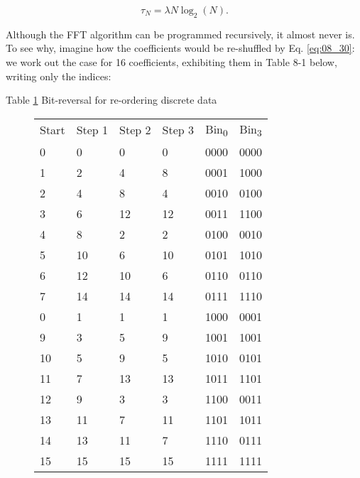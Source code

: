 \begin{equation}
\tau_{N} = \lambda N \log_{2}(N).
\end{equation}

Although the FFT algorithm can be programmed recursively, it almost never is. To see why, imagine how the coefficients would be re-shuffled by Eq. \ref{eq:08_30}: we work out the case for 16 coefficients, exhibiting them in Table 8-1 below, writing only the indices:

Table \ref{table:08_01} Bit-reversal for re-ordering discrete data

\begin{figure}
    \setlength{\tabcolsep}{1em}
    \begin{tabular}{llllll}
        \multicolumn{1}{c}{Start}  &
        \multicolumn{1}{c}{Step 1} &
        \multicolumn{1}{c}{Step 2} &
        \multicolumn{1}{c}{Step 3} & 
        \multicolumn{1}{c}{Bin\textsubscript{0}}  &
        \multicolumn{1}{c}{Bin\textsubscript{3}} \\
        0  &      0  &    0  &    0  &    0000 & 0000 \\
        1  &      2  &    4  &    8  &    0001 & 1000 \\
        2  &      4  &    8  &    4  &    0010 & 0100 \\
        3  &      6  &    12 &    12 &    0011 & 1100 \\
        4  &      8  &    2  &    2  &    0100 & 0010 \\
        5  &      10 &    6  &    10 &    0101 & 1010 \\
        6  &      12 &    10 &    6  &    0110 & 0110 \\
        7  &      14 &    14 &    14 &    0111 & 1110 \\
        0  &      1  &    1  &    1  &    1000 & 0001 \\
        9  &      3  &    5  &    9  &    1001 & 1001 \\
        10 &      5  &    9  &    5  &    1010 & 0101 \\
        11 &      7  &    13 &    13 &    1011 & 1101 \\
        12 &      9  &    3  &    3  &    1100 & 0011 \\
        13 &      11 &    7  &    11 &    1101 & 1011 \\
        14 &      13 &    11 &    7  &    1110 & 0111 \\
        15 &      15 &    15 &    15 &    1111 & 1111
    \end{tabular}
    \label{table:08_01}
\end{figure}

